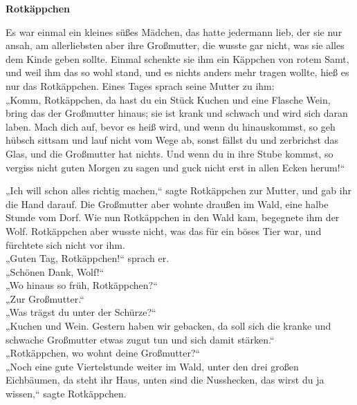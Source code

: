 \documentclass[12pt,a4paper]{article}
\begin{document}
\begin{center}
\Large{\textbf{Rotkäppchen}}
\end{center}

\raggedright
\setlength{\parindent}{1em}
\setlength{\parskip}{0.5\baselineskip}

Es war einmal ein kleines süßes Mädchen, das hatte jedermann lieb, der sie nur ansah, am allerliebsten aber ihre Großmutter, die wusste gar nicht, was sie alles dem Kinde geben sollte. Einmal schenkte sie ihm ein Käppchen von rotem Samt, und weil ihm das so wohl stand, und es nichts anders mehr tragen wollte, hieß es nur das Rotkäppchen. Eines Tages sprach seine Mutter zu ihm:\\
\noindent „Komm, Rotkäppchen, da hast du ein Stück Kuchen und eine Flasche Wein, bring das der Großmutter hinaus; sie ist krank und schwach und wird sich daran laben. Mach dich auf, bevor es heiß wird, und wenn du hinauskommst, so geh hübsch sittsam und lauf nicht vom Wege ab, sonst fällst du und zerbrichst das Glas, und die Großmutter hat nichts. Und wenn du in ihre Stube kommst, so vergiss nicht guten Morgen zu sagen und guck nicht erst in allen Ecken herum!“\par

„Ich will schon alles richtig machen,“ sagte Rotkäppchen zur Mutter, und gab ihr die Hand darauf. Die Großmutter aber wohnte draußen im Wald, eine halbe Stunde vom Dorf. Wie nun Rotkäppchen in den Wald kam, begegnete ihm der Wolf. Rotkäppchen aber wusste nicht, was das für ein böses Tier war, und fürchtete sich nicht vor ihm.\\

„Guten Tag, Rotkäppchen!“ sprach er.\\

„Schönen Dank, Wolf!“\\

„Wo hinaus so früh, Rotkäppchen?“\\

„Zur Großmutter.“\\

„Was trägst du unter der Schürze?“\\

„Kuchen und Wein. Gestern haben wir gebacken, da soll sich die kranke und schwache Großmutter etwas zugut tun und sich damit stärken.“\\

„Rotkäppchen, wo wohnt deine Großmutter?“\\

„Noch eine gute Viertelstunde weiter im Wald, unter den drei großen Eichbäumen, da steht ihr Haus, unten sind die Nusshecken, das wirst du ja wissen,“ sagte Rotkäppchen.
\end{document}
